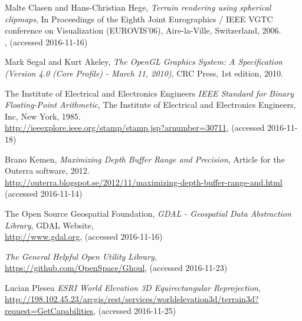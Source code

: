 \begin{thebibliography}{99}
  Malte Clasen and Hans-Christian Hege,
  \emph{Terrain rendering using spherical clipmaps},
  In Proceedings of the Eighth Joint Eurographics / IEEE VGTC conference on Visualization (EUROVIS'06),
  Aire-la-Ville, Switzerland,
  2006. \\
  ,
  (accessed 2016-11-16)

  Mark Segal and Kurt Akeley,
  \emph{The OpenGL Graphics System: A Specification (Version 4.0 (Core Profile) - March 11, 2010)},
  CRC Press,
  1st edition,
  2010.

  The Institute of Electrical and Electronics Engineers
  \emph{IEEE Standard for Binary Floating-Point Arithmetic},
  The Institute of Electrical and Electronics Engineers, Inc,
  New York,
  1985. \\
  \url{http://ieeexplore.ieee.org/stamp/stamp.jsp?arnumber=30711},
  (accessed 2016-11-18)
  
  Brano Kemen,
  \emph{Maximizing Depth Buffer Range and Precision},
  Article for the Outerra software,
  2012. \\
  \url{http://outerra.blogspot.se/2012/11/maximizing-depth-buffer-range-and.html}
  (accessed 2016-11-14)

  The Open Source Geospatial Foundation,
  \emph{GDAL - Geospatial Data Abstraction Library},
  GDAL Website,
  \\
  \url{http://www.gdal.org},
  (accessed 2016-11-16)
  
  \emph{The General Helpful Open Utility Library},
  \\
  \url{https://github.com/OpenSpace/Ghoul},
  (accessed 2016-11-23)
  
  Lucian Plesea
  \emph{ESRI World Elevation 3D Equirectangular Reprojection},
  \\
  \url{http://198.102.45.23/arcgis/rest/services/worldelevation3d/terrain3d?request=GetCapabilities},
  (accessed 2016-11-25)
  
\end{thebibliography}
